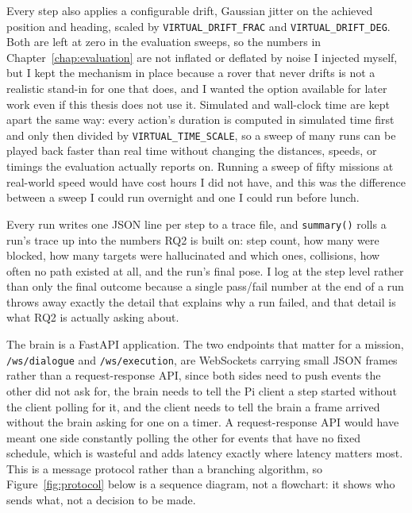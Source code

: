 Every step also applies a configurable drift, Gaussian jitter on the
achieved position and heading, scaled by \texttt{VIRTUAL\_DRIFT\_FRAC} and
\texttt{VIRTUAL\_DRIFT\_DEG}. Both are left at zero in the evaluation
sweeps, so the numbers in Chapter~\ref{chap:evaluation} are not inflated or
deflated by noise I injected myself, but I kept the mechanism in place
because a rover that never drifts is not a realistic stand-in for one that
does, and I wanted the option available for later work even if this
thesis does not use it. Simulated and wall-clock time are kept apart the
same way: every action's duration is computed in simulated time first and
only then divided by \texttt{VIRTUAL\_TIME\_SCALE}, so a sweep of many runs
can be played back faster than real time without changing the distances,
speeds, or timings the evaluation actually reports on. Running a sweep of
fifty missions at real-world speed would have cost hours I did not have,
and this was the difference between a sweep I could run overnight and one
I could run before lunch.

Every run writes one JSON line per step to a trace file, and
\texttt{summary()} rolls a run's trace up into the numbers RQ2 is built on:
step count, how many were blocked, how many targets were hallucinated and
which ones, collisions, how often no path existed at all, and the run's
final pose. I log at the step level rather than only the final outcome
because a single pass/fail number at the end of a run throws away exactly
the detail that explains why a run failed, and that detail is what RQ2 is
actually asking about.

\label{sec:protocol}

The brain is a FastAPI application. The two endpoints that matter for a
mission, \texttt{/ws/dialogue} and \texttt{/ws/execution}, are WebSockets
carrying small JSON frames rather than a request-response API, since both
sides need to push events the other did not ask for, the brain needs to
tell the Pi client a step started without the client polling for it, and
the client needs to tell the brain a frame arrived without the brain asking
for one on a timer. A request-response API would have meant one side
constantly polling the other for events that have no fixed schedule, which
is wasteful and adds latency exactly where latency matters most. This is a
message protocol rather than a branching algorithm, so
Figure~\ref{fig:protocol} below is a sequence diagram, not a flowchart: it
shows who sends what, not a decision to be made.

